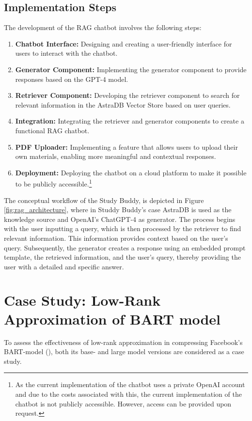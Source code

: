     \subsection{Implementation Steps}
    The development of the RAG chatbot involves the following steps:
    \begin{enumerate}
        \item \textbf{Chatbot Interface:} Designing and creating a user-friendly interface for users to interact with the chatbot.
        \item \textbf{Generator Component:} Implementing the generator component to provide responses based on the GPT-4 model.
        \item \textbf{Retriever Component:} Developing the retriever component to search for relevant information in the AstraDB Vector Store based on user queries.
        \item \textbf{Integration:} Integrating the retriever and generator components to create a functional RAG chatbot.
        \item \textbf{PDF Uploader:} Implementing a feature that allows users to upload their own materials, enabling more meaningful and contextual responses.
        \item \textbf{Deployment:} Deploying the chatbot on a cloud platform to make it possible to be publicly accessible.\footnote{As the current implementation of the chatbot uses a private OpenAI account and due to the costs associated with this, the current implementation of the chatbot is not publicly accessible. However, access can be provided upon request.}

    \end{enumerate}
        
    The conceptual workflow of the Study Buddy, is depicted in Figure \ref{fig:rag_architecture}, where in Studdy Buddy's case AstraDB is used as the knowledge source and OpenAI's ChatGPT-4 as generator. The process begins with the user inputting a query, which is then processed by the retriever to find relevant information. This information provides context based on the user's query. Subsequently, the generator creates a response using an embedded prompt template, the retrieved information, and the user's query, thereby providing the user with a detailed and specific answer.



\section{Case Study: Low-Rank Approximation of BART model}
    To assess the effectiveness of low-rank approximation in compressing Facebook's BART-model (\cite{lewis2019bart}), both its base- and large model versions are considered as a case study.

